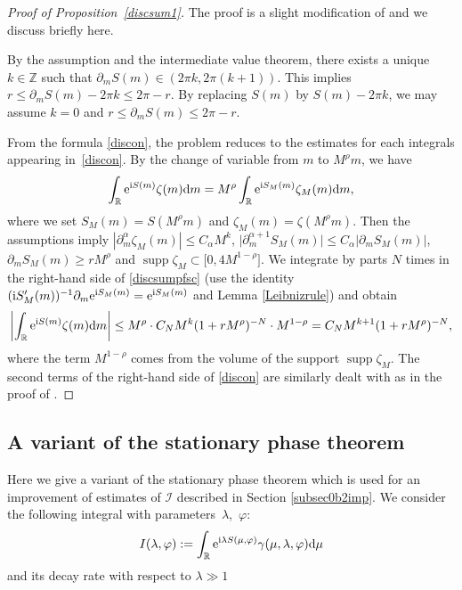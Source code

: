 \documentclass[pdftex]{sigma}
\numberwithin{equation}{section}
\def\R{\mathbb{R}}%
\DeclareMathOperator{\supp}{supp}%
\def\a{\alpha}
\def\c{\gamma}
\def\f{\varphi}
\def\l{\lambda}
\def\m{\mu}
\def\z{\zeta}
\def\pa{\partial}
\newcommand{\sI}{\mathscr{I}}
\begin{document}
\begin{proof}[Proof of Proposition~\ref{discsum1}]
The proof is a slight modification of \cite[Lemma 5.3]{IJ} and we discuss briefly here.

By the assumption and the intermediate value theorem, there exists a unique $k\in\mathbb{Z}$ such that $\pa_mS(m)\in (2\pi k,2\pi (k+1))$. This implies
$r\leq \pa_mS(m)-2\pi k\leq 2\pi -r$. By replacing $S(m)$ by $S(m)-2\pi k$, we may assume $k=0$ and $r\leq \pa_mS(m)\leq 2\pi -r$.

From the formula \eqref{discon}, the problem reduces to the estimates for each integrals appearing in~\eqref{discon}. By the change of variable from $m$ to $M^{\rho}m$, we have
\begin{align}\label{discsumpfsc}
\int_{\R}{\rm e}^{{\rm i}S(m)}\z(m){\rm d}m=M^{\rho}\int_{\R}{\rm e}^{{\rm i}S_M(m)}\z_M(m){\rm d}m,
\end{align}
where we set $S_M(m)\!=S(M^{\rho}m)$ and $\z_M(m)\!=\z(M^{\rho}m)$. Then the assumptions imply $|\pa_m^{\a}\z_M(m)|\allowbreak\leq C_{\a}M^k$, $\big|\pa_m^{\a+1}S_M(m)\big|\leq C_{\a}|\pa_mS_M(m)|$, $\pa_mS_M(m)\geq rM^{\rho}$ and $\supp \z_M\subset \bigl[0,4M^{1-\rho}\bigr]$. We integrate by parts $N$ times in the right-hand side of \eqref{discsumpfsc} (use the identity $({\rm i}S_M'(m))^{-1} \pa_m{\rm e}^{{\rm i}S_M(m)}={\rm e}^{{\rm i}S_M(m)} $ and Lemma \ref{Leibnizrule}) and obtain
\begin{align*}
\left|\int_{\R}{\rm e}^{{\rm i}S(m)}\z(m){\rm d}m\right|\leq M^{\rho}\cdot C_{N}M^k(1+rM^{\rho})^{-N}\cdot M^{1-\rho}=C_NM^{k+1}(1+rM^{\rho})^{-N},
\end{align*}
where the term $M^{1-\rho}$ comes from the volume of the support $\supp \z_M$. The second terms of the right-hand side of \eqref{discon} are similarly dealt with as in the proof of \cite[Lemma 5.3]{IJ}.
\end{proof}

\subsection{A variant of the stationary phase theorem}\label{subsecStphase}

Here we give a variant of the stationary phase theorem which is used for an improvement of estimates of $\sI$ described in Section \ref{subsec0b2imp}.
We consider the following integral with parameters~$\l$,~$\f$:
\begin{align*}
I(\l,\f):=\int_{\R}{\rm e}^{{\rm i}\l S(\m,\f)}\c(\m,\l,\f){\rm d}\m
\end{align*}
and its decay rate with respect to $\l\gg 1$
\end{document}
